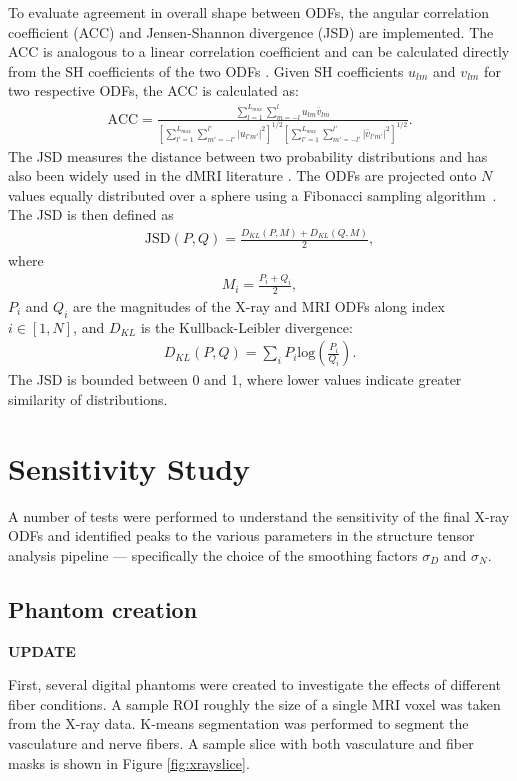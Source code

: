 \documentclass[11pt]{article}
\begin{document}
To evaluate agreement in overall shape between ODFs, the angular correlation coefficient
(ACC) and Jensen-Shannon divergence (JSD) are implemented. The ACC is analogous to
a linear correlation coefficient and can be calculated directly from the SH
coefficients of the two ODFs \cite{Anderson2005}. Given SH coefficients $u_{lm}$ and $v_{lm}$ for
two respective ODFs, the ACC is calculated as:
\begin{align}
  \text{ACC} = \frac{\sum\limits_{l=1}^{L_{max}}\sum\limits_{m=-l}^l u_{lm}\bar{v}_{lm}}{\left[\sum\limits_{l'=1}^{L_{max}}\sum\limits_{m'=-l'}^{l'}|u_{l'm'}|^2\right]^{1/2}\left[\sum\limits_{l'=1}^{L_{max}}\sum\limits_{m'=-l'}^{l'}|\bar{v}_{l'm'}|^2\right]^{1/2}}.
\end{align}
The JSD measures the distance between two probability distributions and has also
been widely used in the dMRI literature \cite{Cohen-Adad2011}. The ODFs are projected onto
$N$ values equally distributed over a sphere using a Fibonacci sampling algorithm~\cite{Hannay2004}.
The JSD is then defined as
\begin{align}
  \text{JSD}(P, Q) = \frac{D_{KL}(P, M) + D_{KL}(Q, M)}{2},
\end{align}
where
\begin{align}
  M_i = \frac{P_i + Q_i}{2},
\end{align}
$P_i$ and $Q_i$ are the magnitudes of the X-ray and MRI ODFs along index
$i \in [1, N]$, and $D_{KL}$ is the Kullback-Leibler divergence:
\begin{align}
  D_{KL}(P, Q) = \sum_i P_i\text{log}\left(\frac{P_i}{Q_i}\right).
\end{align}
The JSD is bounded between 0 and 1, where lower values indicate greater
similarity of distributions.

\section{Sensitivity Study}
A number of tests were performed to understand the sensitivity of the final
X-ray ODFs and identified peaks to the various parameters in the structure
tensor analysis pipeline --- specifically the choice of the smoothing factors
$\sigma_D$ and $\sigma_N$. 

\subsection{Phantom creation}

\textbf{UPDATE}

First, several digital phantoms were created to investigate the effects of
different fiber conditions. A sample ROI roughly the size of a single MRI voxel
was taken from the X-ray data. K-means segmentation was performed to segment the
vasculature and nerve fibers. A sample slice with both vasculature and fiber
masks is shown in Figure \ref{fig:xrayslice}.
\end{document}
